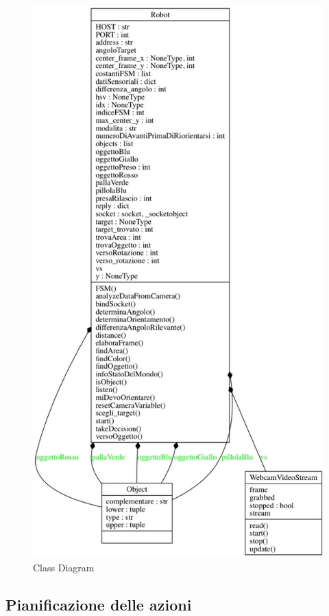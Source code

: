 \documentclass[a4paper,12pt,italian]{article}
\begin{document}
\begin{figure}[H]
\begin{center}
\includegraphics[scale=0.4]{class_diagram}
\caption{Class Diagram}
\label{Fig: class}
\end{center}
\end{figure}


\subsection{Pianificazione delle azioni}
\label{Sec: FSM}
\end{document}
